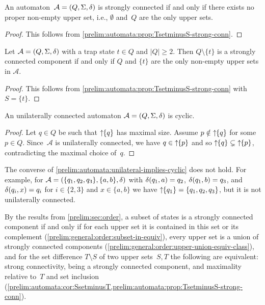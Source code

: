 \begin{proposition}\label{prelim:automata:prop:char-strongly-conn}
	An automaton~$\mathcal A = (Q, \Sigma, \delta)$ 
	is strongly connected 
	if and only if there exists no proper non-empty upper set, i.e., $\emptyset$
	and~$Q$ are the only upper sets.
\end{proposition}
\begin{proof}
	This follows from \cref{prelim:automata:prop:TsetminusS-strong-conn}.	
\end{proof}

\begin{proposition}\label{cor:maximal_upper_set_trap}
	Let $\mathcal A = (Q, \Sigma, \delta)$ with a trap state $t \in Q$ and $|Q| \ge 2$. Then $Q \setminus \{t\}$
	is a strongly connected component
	if and only if $Q$ and $\{t\}$
	are the only non-empty upper sets in $\mathcal A$.		
\end{proposition} 
\begin{proof}
	This follows from \cref{prelim:automata:prop:TsetminusS-strong-conn} with $S = \{t\}$.
\end{proof}

\begin{proposition}\label{prelim:automata:unilateral-implies-cyclic}
	An unilaterally connected
	automaton $\mathcal A = (Q, \Sigma, \delta)$
	is cyclic.
\end{proposition}
\begin{proof}
	Let $q \in Q$ be such that $\mbox{\ensuremath{\displaystyle \uparrow \!\!\{q\}}}$ has maximal size.
	Assume $p \notin \mbox{\ensuremath{\displaystyle \uparrow \!\!\{q\}}}$ for some $p \in Q$.
	Since~$\mathcal A$ is unilaterally connected, 
	we have $q \in \mbox{\ensuremath{\displaystyle \uparrow \!\!\{p\}}}$
	and so $\mbox{\ensuremath{\displaystyle \uparrow \!\!\{q\}}} \subsetneq \mbox{\ensuremath{\displaystyle \uparrow \!\!\{p\}}}$,
	contradicting the maximal choice of~$q$.	
\end{proof}

The converse of \cref{prelim:automata:unilateral-implies-cyclic} does not hold. For example,
for $\mathcal A = (\{q_1, q_2, q_3\}, \{a,b\}, \delta)$
with $\delta(q_1,a) = q_2$, $\delta(q_1,b) = q_3$,
and $\delta(q_i,x) = q_i$ for $i \in \{2,3\}$
and $x \in \{a,b\}$
we have $\mbox{\ensuremath{\displaystyle \uparrow \!\!\{q_1\}}} = \{q_1,q_2,q_3\}$, but
it is not unilaterally connected.

By the results from \cref{prelim:sec:order},
a subset of states is a strongly connected component
if and only if for each upper set it is contained in this set
or its complement (\cref{prelim:general:order:subset-in-equiv}), 
every upper set is a union of strongly connected components (\cref{prelim:general:order:upper-union-equiv-class}),
and for the set difference $T \setminus S$ of two upper sets~$S,T$
the following are equivalent: strong connectivity,
being a strongly connected component, and maximality relative to~$T$ 
and set inclusion (\cref{prelim:automata:cor:SsetminusT,prelim:automata:prop:TsetminusS-strong-conn}).

